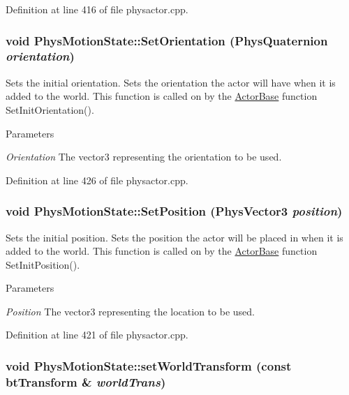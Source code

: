 Definition at line 416 of file physactor.cpp.\hypertarget{classPhysMotionState_a1f8510490f7b4dfb0c85f4ffb6823305}{
\subsubsection[{SetOrientation}]{\setlength{\rightskip}{0pt plus 5cm}void PhysMotionState::SetOrientation ({\bf PhysQuaternion} {\em orientation})}}
\label{d2/d14/classPhysMotionState_a1f8510490f7b4dfb0c85f4ffb6823305}


Sets the initial orientation. Sets the orientation the actor will have when it is added to the world. This function is called on by the \hyperlink{classActorBase}{ActorBase} function SetInitOrientation(). 
\begin{DoxyParams}{Parameters}
\item[{\em Orientation}]The vector3 representing the orientation to be used. \end{DoxyParams}


Definition at line 426 of file physactor.cpp.\hypertarget{classPhysMotionState_aa2fa4f107147626cd33d42fd3fbe178b}{
\subsubsection[{SetPosition}]{\setlength{\rightskip}{0pt plus 5cm}void PhysMotionState::SetPosition ({\bf PhysVector3} {\em position})}}
\label{d2/d14/classPhysMotionState_aa2fa4f107147626cd33d42fd3fbe178b}


Sets the initial position. Sets the position the actor will be placed in when it is added to the world. This function is called on by the \hyperlink{classActorBase}{ActorBase} function SetInitPosition(). 
\begin{DoxyParams}{Parameters}
\item[{\em Position}]The vector3 representing the location to be used. \end{DoxyParams}


Definition at line 421 of file physactor.cpp.\hypertarget{classPhysMotionState_a57c23b922e2c5e8af87dc1318796ec8b}{
\subsubsection[{setWorldTransform}]{\setlength{\rightskip}{0pt plus 5cm}void PhysMotionState::setWorldTransform (const btTransform \& {\em worldTrans})}}
\label{d2/d14/classPhysMotionState_a57c23b922e2c5e8af87dc1318796ec8b}


